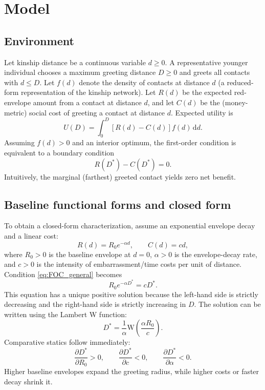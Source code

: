 \documentclass[AER]{AEA}
\newcommand{\LambertW}{\mathrm{W}}
\begin{document}
\section{Model}

\subsection{Environment}
Let kinship distance be a continuous variable $d\ge 0$. A representative younger individual chooses a maximum greeting distance $D\ge 0$ and greets all contacts with $d\le D$. Let $f(d)$ denote the density of contacts at distance $d$ (a reduced-form representation of the kinship network). Let $R(d)$ be the expected red-envelope amount from a contact at distance $d$, and let $C(d)$ be the (money-metric) social cost of greeting a contact at distance $d$. Expected utility is
\begin{equation}
U(D)=\int_{0}^{D}\left[R(d)-C(d)\right]f(d)\,\mathrm{d}d.
\end{equation}
Assuming $f(d)>0$ and an interior optimum, the first-order condition is equivalent to a boundary condition
\begin{equation}
R(D^*)-C(D^*)=0.
\label{eq:FOC_general}
\end{equation}
Intuitively, the marginal (farthest) greeted contact yields zero net benefit.

\subsection{Baseline functional forms and closed form}
To obtain a closed-form characterization, assume an exponential envelope decay and a linear cost:
\begin{equation}
R(d)=R_0 e^{-\alpha d},\qquad C(d)=cd,
\end{equation}
where $R_0>0$ is the baseline envelope at $d=0$, $\alpha>0$ is the envelope-decay rate, and $c>0$ is the intensity of embarrassment/time costs per unit of distance. Condition \eqref{eq:FOC_general} becomes
\begin{equation}
R_0 e^{-\alpha D^*}=cD^*.
\label{eq:FOC_exp_linear}
\end{equation}
This equation has a unique positive solution because the left-hand side is strictly decreasing and the right-hand side is strictly increasing in $D$. The solution can be written using the Lambert W function:
\begin{equation}
D^*=\frac{1}{\alpha}\LambertW\!\left(\frac{\alpha R_0}{c}\right).
\end{equation}
Comparative statics follow immediately:
\begin{equation}
\frac{\partial D^*}{\partial R_0}>0,\qquad
\frac{\partial D^*}{\partial c}<0,\qquad
\frac{\partial D^*}{\partial \alpha}<0.
\end{equation}
Higher baseline envelopes expand the greeting radius, while higher costs or faster decay shrink it.
\end{document}
